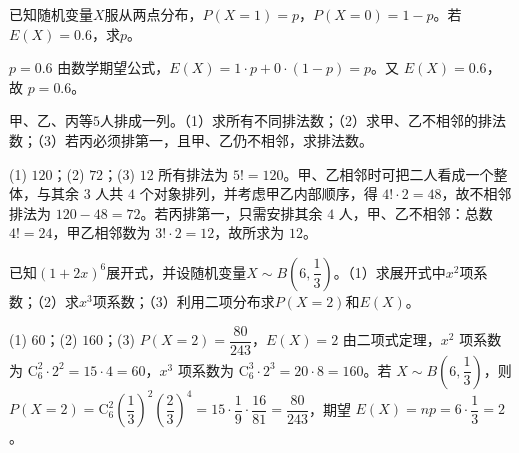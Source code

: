\begin{question}[GPT生成]
已知随机变量$X$服从两点分布，$P(X=1)=p$，$P(X=0)=1-p$。若$E(X)=0.6$，求$p$。
\end{question}
\begin{answer}{$p=0.6$}
由数学期望公式，$E(X)=1\cdot p+0\cdot(1-p)=p$。又 $E(X)=0.6$，故 $p=0.6$。
\end{answer}



\begin{question}[GPT生成]
甲、乙、丙等$5$人排成一列。（1）求所有不同排法数；（2）求甲、乙不相邻的排法数；（3）若丙必须排第一，且甲、乙仍不相邻，求排法数。
\end{question}
\solutionSpace{5cm}
\begin{answer}{(1) $120$；(2) $72$；(3) $12$}
所有排法为 $5!=120$。甲、乙相邻时可把二人看成一个整体，与其余 $3$ 人共 $4$ 个对象排列，并考虑甲乙内部顺序，得 $4!\cdot2=48$，故不相邻排法为 $120-48=72$。若丙排第一，只需安排其余 $4$ 人，甲、乙不相邻：总数 $4!=24$，甲乙相邻数为 $3!\cdot2=12$，故所求为 $12$。
\end{answer}

\begin{question}[GPT生成]
已知$(1+2x)^6$展开式，并设随机变量$X\sim B(6,\dfrac13)$。（1）求展开式中$x^2$项系数；（2）求$x^3$项系数；（3）利用二项分布求$P(X=2)$和$E(X)$。
\end{question}
\solutionSpace{5cm}
\begin{answer}{(1) $60$；(2) $160$；(3) $P(X=2)=\dfrac{80}{243}$，$E(X)=2$}
由二项式定理，$x^2$ 项系数为 $\mathrm{C}_6^2\cdot2^2=15\cdot4=60$，$x^3$ 项系数为 $\mathrm{C}_6^3\cdot2^3=20\cdot8=160$。若 $X\sim B(6,\dfrac13)$，则 $P(X=2)=\mathrm{C}_6^2(\dfrac13)^2(\dfrac23)^4=15\cdot\dfrac19\cdot\dfrac{16}{81}=\dfrac{80}{243}$，期望 $E(X)=np=6\cdot\dfrac13=2$。
\end{answer}

\printChapterAnswers
